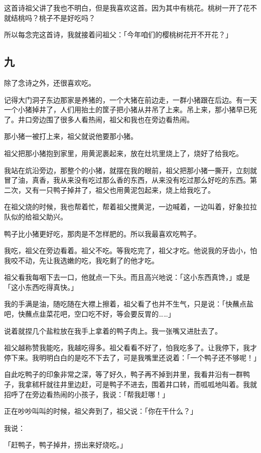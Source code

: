 \documentclass[UTF8]{ctexart}
\begin{document}
这首诗祖父讲了我也不明白，但是我喜欢这首。因为其中有桃花。桃树一开了花不就结桃吗？桃子不是好吃吗？

所以每念完这首诗，我就接着问祖父：「今年咱们的樱桃树花开不开花？」

\subsection{九}

除了念诗之外，还很喜欢吃。

记得大门洞子东边那家是养猪的，一个大猪在前边走，一群小猪跟在后边。有一天一个小猪掉井了，人们用抬土的筐子把小猪从井吊了上来。吊上来，那小猪早已死了。井口旁边围了很多人看热闹，祖父和我也在旁边看热闹。

那小猪一被打上来，祖父就说他要那小猪。

祖父把那小猪抱到家里，用黄泥裹起来，放在灶坑里烧上了，烧好了给我吃。

我站在炕沿旁边，那整个的小猪，就摆在我的眼前，祖父把那小猪一撕开，立刻就冒了油，真香，我从来没有吃过那么香的东西，从来没有吃过那么好吃的东西。第二次，又有一只鸭子掉井了，祖父也用黄泥包起来，烧上给我吃了。

在祖父烧的时候，我也帮着忙，帮着祖父搅黄泥，一边喊着，一边叫着，好象拉拉队似的给祖父助兴。

鸭子比小猪更好吃，那肉是不怎样肥的。所以我最喜欢吃鸭子。

我吃，祖父在旁边看着。祖父不吃。等我吃完了，祖父才吃。他说我的牙齿小，怕我咬不动，先让我选嫩的吃，我吃剩了的他才吃。

祖父看我每咽下去一口，他就点一下头。而且高兴地说：「这小东西真馋，」或是「这小东西吃得真快。」

我的手满是油，随吃随在大襟上擦着，祖父看了也并不生气，只是说：「快蘸点盐吧，快蘸点韭菜花吧，空口吃不好，等会要反胃的……」

说着就捏几个盐粒放在我手上拿着的鸭子肉上。我一张嘴又进肚去了。

祖父越称赞我能吃，我越吃得多。祖父看看不好了，怕我吃多了。让我停下，我才停下来。我明明白白的是吃不下去了，可是我嘴里还说着：「一个鸭子还不够呢！」

自此吃鸭子的印象非常之深，等了好久，鸭子再不掉到井里，我看井沿有一群鸭子，我拿秫杆就往井里边赶，可是鸭子不进去，围着井口转，而呱呱地叫着。我就招呼了在旁边看热闹的小孩子，我说：「帮我赶哪！」

正在吵吵叫叫的时候，祖父奔到了，祖父说：「你在干什么？」

我说：

「赶鸭子，鸭子掉井，捞出来好烧吃。」
\end{document}
